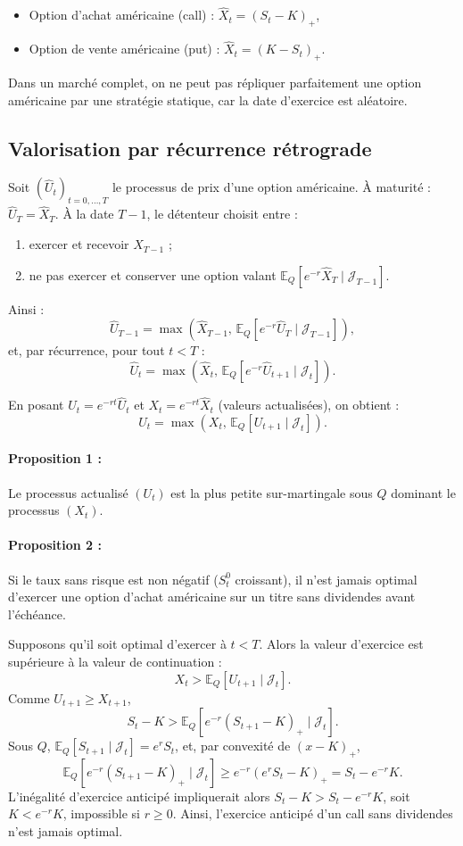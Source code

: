 \documentclass[12pt,a4paper]{article}
\makeatletter
\numberwithin{equation}{section}
\theoremstyle{plain} %
\theoremstyle{definition} %
\theoremstyle{remark} %
\theoremstyle{myexample}
\theoremstyle{definition}
\renewenvironment{proof}[1][\proofname]{%
  \par\vspace{0.8em}%
  \pushQED{\qed}%
  \normalfont\color{cyan}%
  \topsep6\p@\@plus6\p@\relax
  \trivlist
  \item[\hskip\labelsep\bfseries\color{cyan}#1\@addpunct{.}]\ignorespaces
}{%
  \popQED\endtrivlist\vspace{0.8em}%
}
\newcommand{\E}{\mathbb{E}}
\makeatother
\begin{document}
\begin{itemize}
    \item Option d’achat américaine (call) : $\hat{X}_t = (S_t - K)_+$,
    \item Option de vente américaine (put) : $\hat{X}_t = (K - S_t)_+$.
\end{itemize}

Dans un marché complet, on ne peut pas répliquer parfaitement une option américaine par une stratégie statique, car la date d’exercice est aléatoire.

\subsection{Valorisation par récurrence rétrograde}

Soit $(\hat{U}_t)_{t=0,\dots,T}$ le processus de prix d’une option américaine.  
À maturité : $\hat{U}_T = \hat{X}_T$.  
À la date $T-1$, le détenteur choisit entre :
\begin{enumerate}
    \item exercer et recevoir $\hat{X}_{T-1}$ ;
    \item ne pas exercer et conserver une option valant
    $\E_Q[e^{-r}\hat{X}_T \mid \mathcal{J}_{T-1}]$.
\end{enumerate}
Ainsi :
\[
\hat{U}_{T-1} = \max\!\left(\hat{X}_{T-1},\, \E_Q[e^{-r}\hat{U}_T\mid\mathcal{J}_{T-1}]\right),
\]
et, par récurrence, pour tout $t<T$ :
\[
\hat{U}_t = \max\!\left(\hat{X}_t,\, \E_Q[e^{-r}\hat{U}_{t+1}\mid\mathcal{J}_t]\right).
\]

En posant $U_t = e^{-rt}\hat{U}_t$ et $X_t = e^{-rt}\hat{X}_t$ (valeurs actualisées), on obtient :
\[
U_t = \max\!\left(X_t,\, \E_Q[U_{t+1}\mid\mathcal{J}_t]\right).
\]

\paragraph{Proposition 1 :}
Le processus actualisé $(U_t)$ est la plus petite sur-martingale sous $Q$ dominant le processus $(X_t)$.

\paragraph{Proposition 2 :}
Si le taux sans risque est non négatif ($S_t^0$ croissant), il n’est jamais optimal d’exercer une option d’achat américaine sur un titre sans dividendes avant l’échéance.

\begin{proof}
Supposons qu’il soit optimal d’exercer à $t<T$.  
Alors la valeur d’exercice est supérieure à la valeur de continuation :
\[
X_t > \E_Q[U_{t+1}\mid\mathcal{J}_t].
\]
Comme $U_{t+1}\ge X_{t+1}$,
\[
S_t - K > \E_Q[e^{-r}(S_{t+1}-K)_+\mid\mathcal{J}_t].
\]
Sous $Q$, $\E_Q[S_{t+1}\mid\mathcal{J}_t]=e^{r}S_t$, et, par convexité de $(x-K)_+$,
\[
\E_Q[e^{-r}(S_{t+1}-K)_+\mid\mathcal{J}_t]
\ge e^{-r}(e^{r}S_t - K)_+ = S_t - e^{-r}K.
\]
L’inégalité d’exercice anticipé impliquerait alors
$S_t - K > S_t - e^{-r}K$, soit $K < e^{-r}K$, impossible si $r\ge0$.  
Ainsi, l’exercice anticipé d’un call sans dividendes n’est jamais optimal.
\end{proof}
\end{document}
